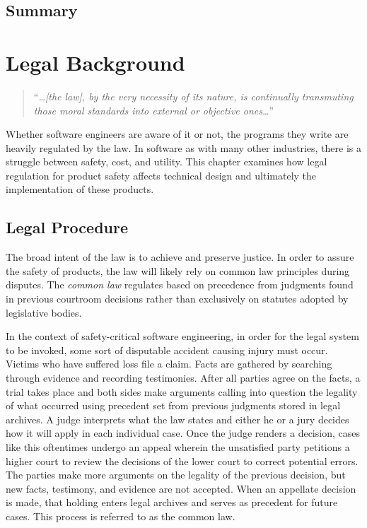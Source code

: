 \documentclass[12pt]{report}
\begin{document}
\section{Summary} 

\chapter{Legal Background}  

\begin{quote} 
``\textit{\ldots [the law], by the very necessity of its nature, is continually transmuting those moral standards into external or objective ones\ldots}'' 
\end{quote} 

Whether software engineers are aware of it or not, the programs they write are heavily regulated by the law. In software as with many other industries, there is a struggle between safety, cost, and utility. This chapter examines how legal regulation for product safety affects technical design and ultimately the implementation of these products. 

\section{Legal Procedure}  

The broad intent of the law is to achieve and preserve justice. In order to assure the safety of products, the law will likely rely on common law principles during disputes. The \textit{common law} regulates based on precedence from judgments found in previous courtroom decisions rather than exclusively on statutes adopted by legislative bodies.  

In the context of safety-critical software engineering, in order for the legal system to be invoked, some sort of disputable accident causing injury must occur. Victims who have suffered loss file a claim. Facts are gathered by searching through evidence and recording testimonies. After all parties agree on the facts, a trial takes place and both sides make arguments calling into question the legality of what occurred using precedent set from previous judgments stored in legal archives. A judge interprets what the law states and either he or a jury decides how it will apply in each individual case. Once the judge renders a decision, cases like this oftentimes undergo an appeal wherein the unsatisfied party petitions a higher court to review the decisions of the lower court to correct potential errors. The parties make more arguments on the legality of the previous decision, but new facts, testimony, and evidence are not accepted. When an appellate decision is made, that holding enters legal archives and serves as precedent for future cases. This process is referred to as the common law.  
\end{document}

